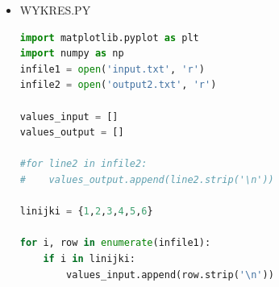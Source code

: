 \documentclass[12pt,a4paper]{article}
\begin{document}
\begin{itemize}
\begin{lstlisting}[language=Python]
for name in plikiinput:
    with open(name) as f:
        word = f.readlines()
        input += word
        f.close()

for name in plikioutput:
    with open(name) as f:
        word = f.readlines()
        output += word
        f.close()

strona.write('<!DOCTYPE HTML>\n'
           '<html lang="pl">\n<head>'
           '<title>Adam Kierat Projekt</title>\n'
           '<link rel="stylesheet" href="style.css" type="text/css" /> \n'
           '</head> \n'
           '<body> \n'
           '<div id="container"> \n'
           '<div id="header">WI_DATY- Projekt Jezyki Skryptowe</div> </div> \n'
           '<div id="content"> \n'
           '<div id="tab">\n'
           '<table>\n'
           '<tr>\n'
           '<th>Data w systemie binarnym</th>\n'
           '<th>Data w systemie dziesiątkowym</th>\n'
           '</tr>\n')
i = 0

while (i<len(input)):
    strona.write('                 <tr>\n                     '
               '                       <td>')
    strona.write(input[i].replace('\n', ''))
    strona.write('</td>\n                     <td>')
    strona.write(output[i].replace('\n', ''))
    strona.write('</td> \n                 </tr>\n')
    i = i+1

strona.write(
           '                </table>\n'
           '            </div>\n'
           '        <center><img src="wykres.png"></center>   </div> \n'
           '           <div id="footer"> \n'
           '                 Adam Kierat WI_DATY- Projekt Jezyki Skryptowe, 2019  \n'
           '           </div> \n'
           '    </div> \n'
           '</body> \n')

strona.close()


	\end{lstlisting}
		\newpage
		
    	\newpage
	\item WYKRES.PY
	\begin{lstlisting}[language=Python]
import matplotlib.pyplot as plt
import numpy as np
infile1 = open('input.txt', 'r')
infile2 = open('output2.txt', 'r')

values_input = []
values_output = []

#for line2 in infile2:
#    values_output.append(line2.strip('\n'))

linijki = {1,2,3,4,5,6}

for i, row in enumerate(infile1):
    if i in linijki:
        values_input.append(row.strip('\n'))


\end{lstlisting}
\end{itemize}
\end{document}
